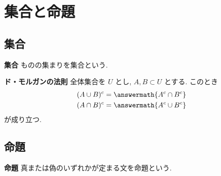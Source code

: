 \section{集合と命題}

\subsection{集合}

\begin{definitionbox}[def:集合]{\textbf{集合}}
ものの集まりを集合という.
\end{definitionbox}

\begin{theorembox}{\textbf{ド・モルガンの法則}}
全体集合を \(U\) とし, \(A,B \subset U\) とする. このとき
\begin{align}
  (A \cup B)^{c} &= \answermath{A^{c} \cap B^{c}} \\
  (A \cap B)^{c} &= \answermath{A^{c} \cup B^{c}}
\end{align}
が成り立つ.
\end{theorembox}

\newpage

\subsection{命題}

\begin{definitionbox}[def:命題]{\textbf{命題}}
真または偽のいずれかが定まる文を命題という.
\end{definitionbox}

